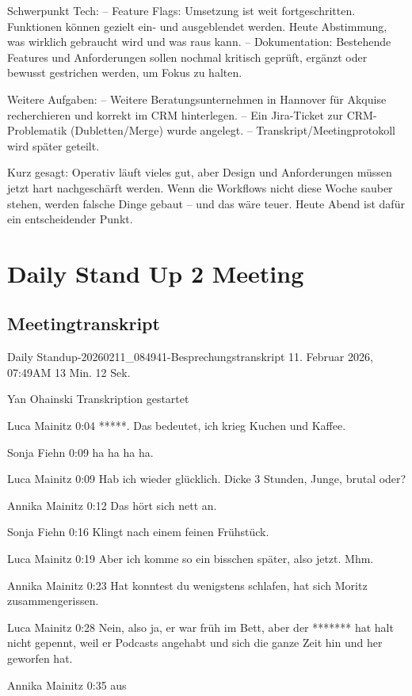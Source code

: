 Schwerpunkt Tech:
– Feature Flags: Umsetzung ist weit fortgeschritten. Funktionen können gezielt ein- und ausgeblendet werden. Heute Abstimmung, was wirklich gebraucht wird und was raus kann.
– Dokumentation: Bestehende Features und Anforderungen sollen nochmal kritisch geprüft, ergänzt oder bewusst gestrichen werden, um Fokus zu halten.

Weitere Aufgaben:
– Weitere Beratungsunternehmen in Hannover für Akquise recherchieren und korrekt im CRM hinterlegen.
– Ein Jira-Ticket zur CRM-Problematik (Dubletten/Merge) wurde angelegt.
– Transkript/Meetingprotokoll wird später geteilt.

Kurz gesagt:
Operativ läuft vieles gut, aber Design und Anforderungen müssen jetzt hart nachgeschärft werden. Wenn die Workflows nicht diese Woche sauber stehen, werden falsche Dinge gebaut – und das wäre teuer. Heute Abend ist dafür ein entscheidender Punkt.

\section{Daily Stand Up 2 Meeting}
\subsection{Meetingtranskript}
\label{app:Daily2_transkript}
Daily Standup-20260211\_084941-Besprechungstranskript
11. Februar 2026, 07:49AM
13 Min. 12 Sek.

Yan Ohainski Transkription gestartet

Luca Mainitz   0:04
*****.
Das bedeutet, ich krieg Kuchen und Kaffee.

Sonja Fiehn   0:09
ha ha ha ha.

Luca Mainitz   0:09
Hab ich wieder glücklich.
Dicke 3 Stunden, Junge, brutal oder?

Annika Mainitz   0:12
Das hört sich nett an.

Sonja Fiehn   0:16
Klingt nach einem feinen Frühstück.

Luca Mainitz   0:19
Aber ich komme so ein bisschen später, also jetzt.
Mhm.

Annika Mainitz   0:23
Hat konntest du wenigstens schlafen, hat sich Moritz zusammengerissen.

Luca Mainitz   0:28
Nein, also ja, er war früh im Bett, aber der ******* hat halt nicht gepennt, weil er Podcasts angehabt und sich die ganze Zeit hin und her geworfen hat.

Annika Mainitz   0:35
aus

